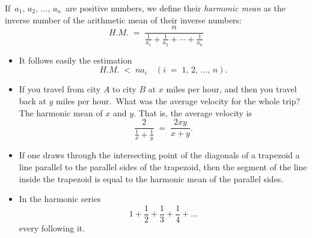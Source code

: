 \documentclass{article}
\begin{document}
If\, $a_1,\,a_2,\,\ldots,\,a_n$\, are positive numbers, we define their \emph{harmonic mean} as the inverse number of the arithmetic mean of their inverse numbers:
$$H.M. \;=\; \frac{n}{\frac{1}{a_1}+\frac{1}{a_2}+\cdots+\frac{1}{a_n}}$$
\bigskip

\begin{itemize}

\item It follows easily the estimation
$$H.M. \;<\; na_i \quad (i \;=\; 1,\,2,\,\ldots,\,n).$$

\item If you travel from city $A$ to city $B$ at $x$ miles per hour, and then you travel back at $y$ miles per hour.\, What was the average velocity for the whole trip?\\
The harmonic mean of $x$ and $y$. That is, the average velocity is
$$\frac{2}{\frac{1}{x}+\frac{1}{y}} \;=\; \frac{2xy}{x\!+\!y}.$$

\item If one draws through the intersecting point of the diagonals of a trapezoid a line parallel to the parallel sides of the trapezoid, then the segment of the line inside the trapezoid is equal to the harmonic mean of the parallel sides.

\item In the harmonic series
$$1+\frac{1}{2}+\frac{1}{3}+\frac{1}{4}+...$$
every  following it.

\end{itemize}
\end{document}

